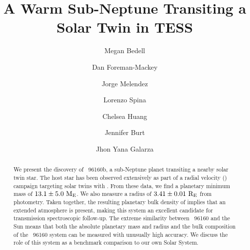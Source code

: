 \documentclass[modern]{aastex62}
\newcommand{\hoststar}{\acronym{HIP}\ 96160\xspace}
\newcommand{\plname}{\acronym{HIP}\ 96160b\xspace}
\newcommand{\plmass}{$13.1 \pm 5.0\ \mearth$\xspace}
\newcommand{\plradius}{$3.41 \pm 0.01\ \rearth$\xspace}
\newcommand{\pldensity}{\todo{TODO} \gcm\xspace}
\begin{document}
\sloppy\sloppypar\raggedbottom\frenchspacing %

\graphicspath{ {figures/} }

\title{A Warm Sub-Neptune Transiting a Solar Twin in TESS}

\author[0000-0001-9907-7742]{Megan Bedell}
\affiliation{\flatiron}

\author{Dan Foreman-Mackey}
\affiliation{\flatiron}

\author{Jorge Melendez}
\affiliation{\USP}

\author{Lorenzo Spina}

\author{Chelsea Huang}
\affiliation{\MIT}

\author{Jennifer Burt}
\affiliation{\MIT}

\author{Jhon Yana Galarza}
\affiliation{\USP}



\author{}





\begin{abstract}\noindent
We present the discovery of \plname, a sub-Neptune planet transiting a nearby solar twin star. 
The host star has been observed extensively as part of a radial velocity (\RV) campaign targeting solar twins with \HARPS. 
From these data, we find a planetary minimum mass of \plmass. 
We also measure a radius of \plradius from \TESS photometry. 
Taken together, the resulting planetary bulk density of \pldensity implies that an extended atmosphere is present, making this system an excellent candidate for transmission spectroscopic follow-up. 
The extreme similarity between \hoststar and the Sun means that both the absolute planetary mass and radius and the bulk composition of the \hoststar system can be measured with unusually high accuracy. 
We discuss the role of this system as a benchmark comparison to our own Solar System.


\end{abstract}
\end{document}
